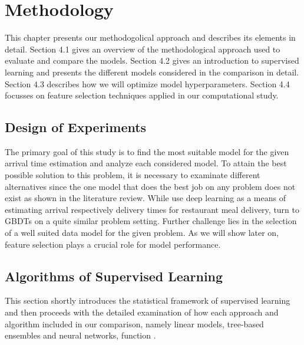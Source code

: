 

\chapter{Methodology}
This chapter presents our methodogolical approach and describes its elements in detail.
Section 4.1 gives an overview of the methodological approach used to evaluate and compare the models. 
Section 4.2 gives an introduction to supervised learning and presents the different models considered in the comparison in detail.
Section 4.3 describes how we will optimize model hyperparameters. 
Section 4.4 focusses on feature selection techniques applied in our computational study.

\section{Design of Experiments}

The primary goal of this study is to find the most suitable model for the given arrival time estimation and analyze each considered model. To attain the best possible solution to this problem, it is necessary to examinate different alternatives since the one model that does the best job on any problem does not exist as shown in the literature review. While \cite{Zhu2020_OFCTE_DL} use deep learning as a means of estimating arrival respectively delivery times for restaurant meal delivery, \cite{Hildebrandt2020_EAT} turn to GBDTs on a quite similar problem setting. Further challenge lies in the selection of a well suited data model for the given problem. As we will show later on, feature selection plays a crucial role for model performance. 

\section{Algorithms of Supervised Learning}

This section shortly introduces the statistical framework of supervised learning \citep{SLFoundations} and then proceeds with the detailed examination of how each approach and algorithm included in our comparison, namely linear models, tree-based ensembles and neural networks, function \citep{friedman2001elements}.

